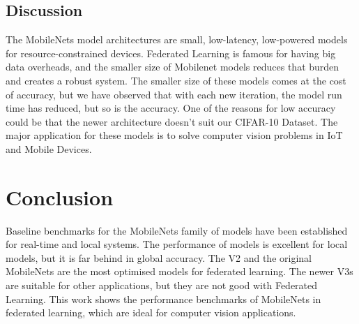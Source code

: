 \documentclass[conference]{IEEEtran}
\begin{document}
\subsection{Discussion}
The MobileNets model architectures are small, low-latency, low-powered models for resource-constrained devices. Federated Learning is famous for having big data overheads, and the smaller size of Mobilenet models reduces that burden and creates a robust system. The smaller size of these models comes at the cost of accuracy, but we have observed that with each new iteration, the model run time has reduced, but so is the accuracy. One of the reasons for low accuracy could be that the newer architecture doesn't suit our CIFAR-10 Dataset. The major application for these models is to solve computer vision problems in IoT and Mobile Devices.  
\section{Conclusion}
Baseline benchmarks for the MobileNets family of models have been established for real-time and local systems. The performance of models is excellent for local models, but it is far behind in global accuracy. The V2 and the original MobileNets are the most optimised models for federated learning. The newer V3s are suitable for other applications, but they are not good with Federated Learning. This work shows the performance benchmarks of MobileNets in federated learning, which are ideal for computer vision applications. 



\end{document}
